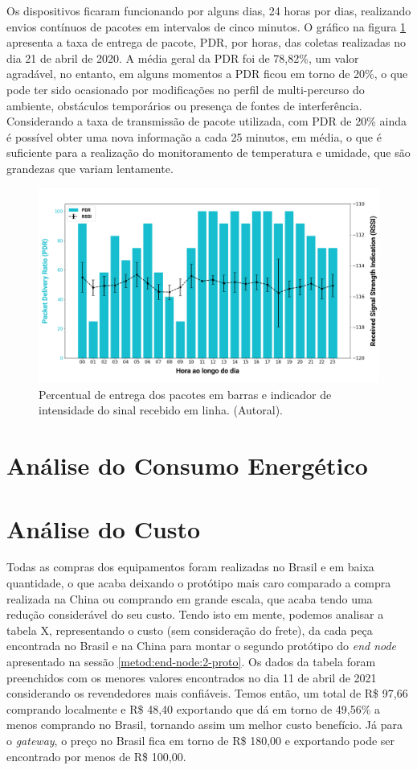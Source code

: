 Os dispositivos ficaram funcionando por alguns dias, 24 horas por dias, realizando envios contínuos de pacotes em intervalos de cinco minutos. O gráfico na figura \ref{fig:21-04-2020-pdr-rssi} apresenta a taxa de entrega de pacote, PDR, por horas, das coletas realizadas no dia 21 de abril de 2020. A média geral da PDR foi de 78,82\%, um valor agradável, no entanto, em alguns momentos a PDR ficou em torno de 20\%, o que pode ter sido ocasionado por modificações no perfil de multi-percurso do ambiente, obstáculos temporários ou presença de fontes de interferência. Considerando a taxa de transmissão de pacote utilizada, com PDR de 20\% ainda é possível obter uma nova informação a cada 25 minutos, em média, o que é suficiente para a realização do monitoramento de temperatura e umidade, que são grandezas que variam lentamente.

\begin{figure}[H]
  \centering
  \includegraphics[width=.80\textwidth]{assets/21-04-2020-pdr-rssi.png} 
  \caption{Percentual de entrega dos pacotes em barras e indicador de intensidade do sinal recebido em linha. (Autoral).}
  \label{fig:21-04-2020-pdr-rssi} 
\end{figure}

\section{Análise do Consumo Energético}
\label{result:consumo}
\section{Análise do Custo}
\label{result:custo}
Todas as compras dos equipamentos foram realizadas no Brasil e em baixa quantidade, o que acaba deixando o protótipo mais caro comparado a compra realizada na China ou comprando em grande escala, que acaba tendo uma redução considerável do seu custo. Tendo isto em mente, podemos analisar a tabela X, representando o custo (sem consideração do frete), da cada peça encontrada no Brasil e na China para montar o segundo protótipo do \textit{end node} apresentado na sessão \ref{metod:end-node:2-proto}. Os dados da tabela foram preenchidos com os menores valores encontrados no dia 11 de abril de 2021 considerando os revendedores mais confiáveis. Temos então, um total de R\$ 97,66 comprando localmente e R\$ 48,40 exportando que dá em torno de 49,56\% a menos comprando no Brasil, tornando assim um melhor custo benefício.	Já para o \textit{gateway}, o preço no Brasil fica em torno de R\$  180,00 e exportando pode ser encontrado por menos de R\$  100,00.

